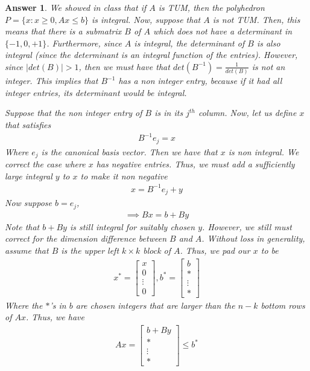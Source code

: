 \documentclass[12pt]{article}
\theoremstyle{colon}
\newtheorem*{answer}{Answer}
\begin{document}
\begin{answer}
  We showed in class that if $A$ is TUM, then the polyhedron $P = \{ x : x \geq 0, Ax \leq b \}$ is integral. Now, suppose that $A$ is not TUM. Then, this means that there is a submatrix $B$ of $A$ which does not have a determinant in $\{-1, 0, +1\}$. Furthermore, since $A$ is integral, the determinant of $B$ is also integral (since the determinant is an integral function of the entries). However, since $\lvert det(B) \rvert > 1$, then we must have that $det(B^{-1}) = \frac{1}{det(B)}$ is not an integer. This implies that $B^{-1}$ has a non integer entry, because if it had all integer entries, its determinant would be integral.

  Suppose that the non integer entry of $B$ is in its $j^{th}$ column. Now, let us define $x$ that satisfies
  \begin{gather*}
    B^{-1} e_j = x
  \end{gather*}
  Where $e_j$ is the canonical basis vector. Then we have that $x$ is non integral. We correct the case where $x$ has negative entries. Thus, we must add a sufficiently large integral $y$ to $x$ to make it non negative
  \begin{gather*}
    x = B^{-1} e_j + y
  \end{gather*}
  Now suppose $b = e_j$,
  \begin{gather*}
    \implies B x = b + B y
  \end{gather*}
  Note that $b + B y$ is still integral for suitably chosen $y$. However, we still must correct for the dimension difference between $B$ and $A$. Without loss in generality, assume that $B$ is the upper left $k \times k$ block of $A$. Thus, we pad our $x$ to be
  \begin{gather*}
    x^* = \begin{bmatrix} x \\ 0 \\ \vdots \\ 0 \end{bmatrix}, b^* = \begin{bmatrix} b \\ * \\ \vdots \\ *  \end{bmatrix}
  \end{gather*}
  Where the $*$'s in $b$ are chosen integers that are larger than the $n-k$ bottom rows of $Ax$. Thus, we have
  \begin{gather*}
    A x = \begin{bmatrix} b + B y \\ * \\ \vdots \\ * \end{bmatrix} \leq b^*

\end{gather*}
\end{answer}
\end{document}
